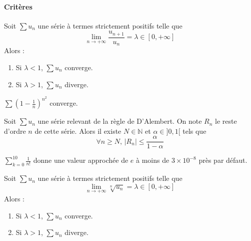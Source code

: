 	\paragraph{Critères}

	\begin{proposition}
		Soit $\sum u_n$ une série à termes strictement positifs telle que
		\[ \lim_{n \rightarrow +\infty} \frac{u_{n+1}}{u_n} = \lambda \in [0, +\infty] \]
		Alors :
		\begin{enumerate}[label=(\roman*)]
			\item Si $\lambda < 1$, $\sum u_n$ converge.
			\item Si $\lambda > 1$, $\sum u_n$ diverge.
		\end{enumerate}
	\end{proposition}


	\begin{example}
		$\sum \left( 1 - \frac{1}{n} \right)^{n^2}$ converge.
	\end{example}


	\begin{proposition}
		Soit $\sum u_n$ une série relevant de la règle de D'Alembert. On note $R_n$ le reste d'ordre $n$ de cette série. Alors il existe $N \in \mathbb{N}$ et $\alpha \in ]0,1[$ tels que
		\[ \forall n \geq N, \, |R_n| \leq \frac{\alpha}{1-\alpha} \]
	\end{proposition}

	\begin{example}
		$\sum_{k=0}^{10} \frac{1}{n!}$ donne une valeur approchée de $e$ à moins de $3 \times 10^{-8}$ près par défaut.
	\end{example}


	\begin{proposition}
		Soit $\sum u_n$ une série à termes strictement positifs telle que
		\[ \lim_{n \rightarrow +\infty} \sqrt[n]{u_n} = \lambda \in [0, +\infty] \]
		Alors :
		\begin{enumerate}[label=(\roman*)]
			\item Si $\lambda < 1$, $\sum u_n$ converge.
			\item Si $\lambda > 1$, $\sum u_n$ diverge.
		\end{enumerate}
	\end{proposition}


